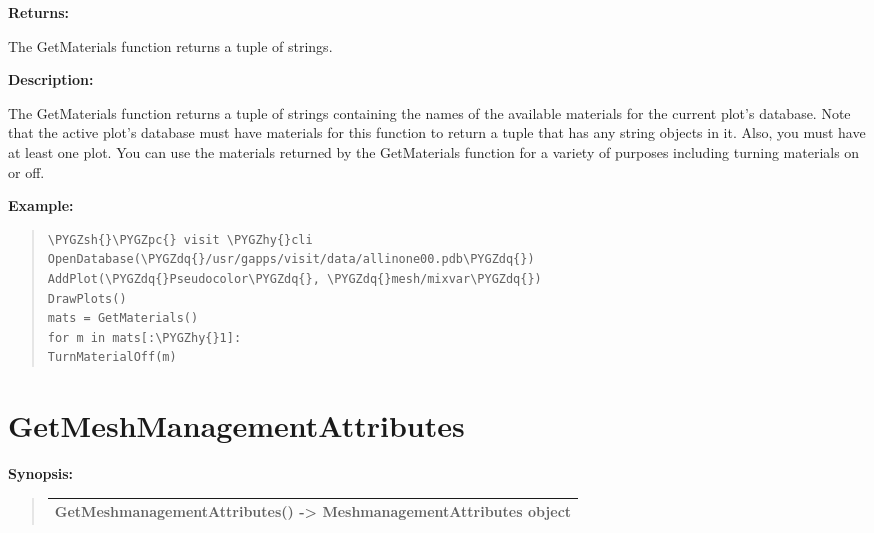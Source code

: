 \documentclass[letterpaper,10pt,english]{sphinxmanual}
\def\PYGZsh{\char`\#}
\def\PYGZpc{\char`\%}
\def\PYGZhy{\char`\-}
\def\PYGZdq{\char`\"}
\begin{document}
\begin{DUlineblock}{0em}
\item[] 
\item[] \textbf{Returns:}
\item[] The GetMaterials function returns a tuple of strings.
\item[] 
\item[] \textbf{Description:}
\item[] The GetMaterials function returns a tuple of strings containing the names
of the available materials for the current plot's database. Note that the
active plot's database must have materials for this function to return a
tuple that has any string objects in it. Also, you must have at least one
plot. You can use the materials returned by the GetMaterials function for a
variety of purposes including turning materials on or off.
\end{DUlineblock}

\begin{DUlineblock}{0em}
\item[] 
\end{DUlineblock}

\begin{DUlineblock}{0em}
\item[] \textbf{Example:}
\item[] 
\end{DUlineblock}
\begin{quote}

\begin{Verbatim}[commandchars=\\\{\}]
\PYGZsh{}\PYGZpc{} visit \PYGZhy{}cli
OpenDatabase(\PYGZdq{}/usr/gapps/visit/data/allinone00.pdb\PYGZdq{})
AddPlot(\PYGZdq{}Pseudocolor\PYGZdq{}, \PYGZdq{}mesh/mixvar\PYGZdq{})
DrawPlots()
mats = GetMaterials()
for m in mats[:\PYGZhy{}1]:
TurnMaterialOff(m)
\end{Verbatim}
\end{quote}


\section{GetMeshManagementAttributes}
\label{functions:getmeshmanagementattributes}
\begin{DUlineblock}{0em}
\item[] \textbf{Synopsis:}
\end{DUlineblock}
\begin{quote}

\begin{tabulary}{\linewidth}{|L|}
\hline

GetMeshmanagementAttributes() -\textgreater{} MeshmanagementAttributes object
\\
\hline\end{tabulary}

\end{quote}
\end{document}
